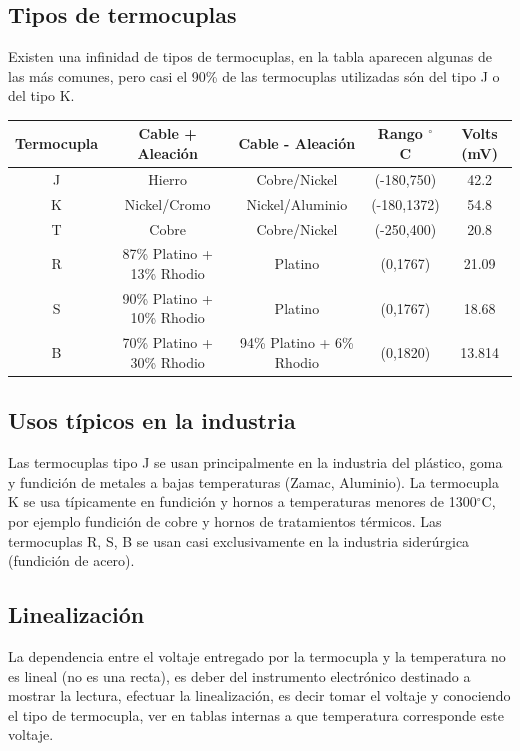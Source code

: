 \documentclass[a4paper,11pt]{report}
\begin{document}
\subsection{Tipos de termocuplas}
Existen una infinidad de tipos de termocuplas, en la tabla aparecen algunas de las más comunes, pero casi el 90\% de las termocuplas utilizadas són del tipo J o del tipo K.
\begin{center}
\begin{tabular}{|c|c|c|c|c|}
\hline 
Termocupla & Cable + Aleación & Cable - Aleación & Rango $^{\circ}$ C & Volts (mV) \\ 
\hline 
J & Hierro & Cobre/Nickel & (-180,750) & 42.2 \\ 
\hline 
K & Nickel/Cromo & Nickel/Aluminio & (-180,1372) & 54.8 \\ 
\hline 
T & Cobre & Cobre/Nickel & (-250,400) & 20.8 \\ 
\hline 
R & 87\% Platino + 13\% Rhodio & Platino & (0,1767) & 21.09 \\ 
\hline 
S & 90\% Platino + 10\% Rhodio & Platino & (0,1767) & 18.68 \\ 
\hline 
B & 70\% Platino + 30\% Rhodio & 94\% Platino + 6\% Rhodio & (0,1820) & 13.814 \\ 
\hline 
\end{tabular} 
\end{center}
\subsection{Usos típicos en la industria}
Las termocuplas tipo J se usan principalmente en la industria del plástico, goma y fundición de metales a bajas temperaturas (Zamac, Aluminio). La termocupla K se usa típicamente en fundición y hornos a temperaturas menores de 1300$^{\circ}$C, por ejemplo fundición de cobre y hornos de tratamientos térmicos. Las termocuplas R, S, B se usan casi exclusivamente en la industria siderúrgica (fundición de acero).
\subsection{Linealización}
La dependencia entre el voltaje entregado por la termocupla y la temperatura no es lineal (no es una recta), es deber del instrumento electrónico destinado a mostrar la lectura, efectuar la linealización, es decir tomar el voltaje y conociendo el tipo de termocupla, ver en tablas internas a que temperatura corresponde este voltaje.
\end{document}
